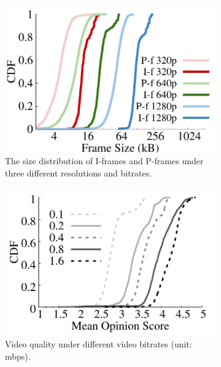 \begin{figure}[ht]
  \begin{subfigure}[t]{0.32\textwidth}
    \includegraphics[width=\linewidth]{Figs/RTDrive/I_P_frame_size.pdf}
    \caption{The size distribution of I-frames and P-frames under three different resolutions and bitrates.}
    \label{frame_size}
  \end{subfigure}
\hspace{0.3cm}
  \begin{subfigure}[t]{0.32\textwidth}
    \includegraphics[width=\linewidth]{Figs/RTDrive/video_bitrate_quality.pdf}
    \caption{Video quality under different video bitrates (unit: mbps).}
    \label{bitrate_quality}
  \end{subfigure}
\hspace{0.3cm}
  \begin{subfigure}[t]{0.32\textwidth}

\end{subfigure}
\end{figure}
